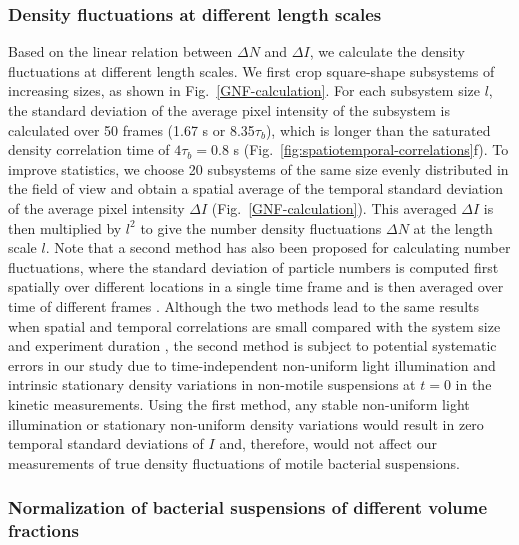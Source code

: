 \documentclass[twocolumn,aps,prx,amsmath,amssymb,longbibliography,superscriptaddress]{revtex4-2}
\begin{document}
\subsubsection{Density fluctuations at different length scales}

Based on the linear relation between $\Delta N$ and $\Delta I$, we calculate the density fluctuations at different length scales. We first crop square-shape subsystems of increasing sizes, as shown in Fig.~\ref{GNF-calculation}. For each subsystem size $l$, the standard deviation of the average pixel intensity of the subsystem is calculated over 50 frames (1.67 s or 8.35$\tau_b$), which is longer than the saturated density correlation time of $4\tau_b = 0.8$ s (Fig.~\ref{fig:spatiotemporal-correlations}f). To improve statistics, we choose 20 subsystems of the same size evenly distributed in the field of view and obtain a spatial average of the temporal standard deviation of the average pixel intensity $\Delta I$ (Fig.~\ref{GNF-calculation}). This averaged $\Delta I$ is then multiplied by $l^2$ to give the number density fluctuations $\Delta N$ at the length scale $l$. Note that a second method has also been proposed for calculating number fluctuations, where the standard deviation of particle numbers is computed first spatially over different locations in a single time frame and is then averaged over time of different frames \cite{Aranson2008}.  Although the two methods lead to the same results when spatial and temporal correlations are small compared with the system size and experiment duration \cite{Aranson2008}, the second method is subject to potential systematic errors in our study due to time-independent non-uniform light illumination and intrinsic stationary density variations in non-motile suspensions at $t=0$ in the kinetic measurements. Using the first method, any stable non-uniform light illumination or stationary non-uniform density variations would result in zero temporal standard deviations of $I$ and, therefore, would not affect our measurements of true density fluctuations of motile bacterial suspensions.


\subsubsection{Normalization of bacterial suspensions of different volume fractions}
\end{document}
